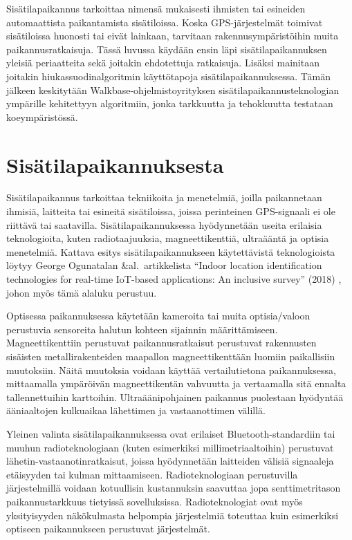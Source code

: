 \documentclass[
  12pt,
  a4paper, twoside]{book}
\begin{document}
Sisätilapaikannus tarkoittaa nimensä mukaisesti ihmisten tai esineiden automaattista paikantamista sisätiloissa. Koska GPS-järjestelmät toimivat sisätiloissa huonosti tai eivät lainkaan, tarvitaan rakennusympäristöihin muita paikannusratkaisuja. Tässä luvussa käydään ensin läpi sisätilapaikannuksen yleisiä periaatteita sekä joitakin ehdotettuja ratkaisuja. Lisäksi mainitaan joitakin hiukassuodinalgoritmin käyttötapoja sisätilapaikannuksessa. Tämän jälkeen keskitytään Walkbase-ohjelmistoyrityksen sisätilapaikannusteknologian ympärille kehitettyyn algoritmiin, jonka tarkkuutta ja tehokkuutta testataan koeympäristössä.

\section{Sisätilapaikannuksesta}

Sisätilapaikannus tarkoittaa tekniikoita ja menetelmiä, joilla paikannetaan ihmisiä, laitteita tai esineitä sisätiloissa, joissa perinteinen GPS-signaali ei ole riittävä tai saatavilla. Sisätilapaikannuksessa hyödynnetään useita erilaisia teknologioita, kuten radiotaajuuksia, magneettikenttiä, ultraääntä ja optisia menetelmiä. Kattava esitys sisätilapaikannukseen käytettävistä teknologioista löytyy George Ogunatalan \&al.~artikkelista ``Indoor location identification technologies for real-time IoT-based applications: An inclusive survey'' (2018) \citep{oguntala-2018}, johon myös tämä alaluku perustuu.

Optisessa paikannuksessa käytetään kameroita tai muita optisia/valoon perustuvia sensoreita halutun kohteen sijainnin määrittämiseen. Magneettikenttiin perustuvat paikannusratkaisut perustuvat rakennusten sisäisten metallirakenteiden maapallon magneettikenttään luomiin paikallisiin muutoksiin. Näitä muutoksia voidaan käyttää vertailutietona paikannuksessa, mittaamalla ympäröivän magneettikentän vahvuutta ja vertaamalla sitä ennalta tallennettuihin karttoihin. Ultraäänipohjainen paikannus puolestaan hyödyntää ääniaaltojen kulkuaikaa lähettimen ja vastaanottimen välillä.

Yleinen valinta sisätilapaikannuksessa ovat erilaiset Bluetooth-standardiin tai muuhun radioteknologiaan (kuten esimerkiksi millimetriaaltoihin) perustuvat lähetin-vastaanotinratkaisut, joissa hyödynnetään laitteiden välisiä signaaleja etäisyyden tai kulman mittaamiseen. Radioteknologiaan perustuvilla järjestelmillä voidaan kotuullisin kustannuksin saavuttaa jopa senttimetritason paikannustarkkuus tietyissä sovelluksissa. Radioteknologiat ovat myös yksityisyyden näkökulmasta helpompia järjestelmiä toteuttaa kuin esimerkiksi optiseen paikannukseen perustuvat järjestelmät.
\end{document}
